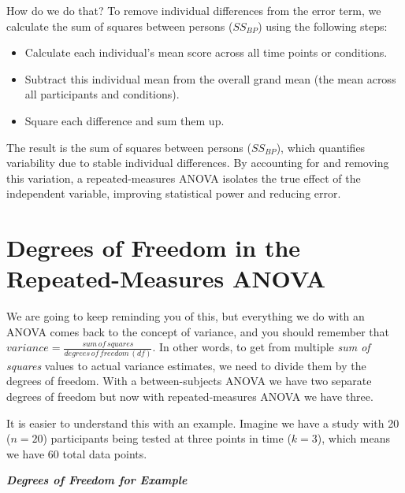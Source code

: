 \documentclass[
  letterpaper,
  DIV=11,
  numbers=noendperiod]{scrreprt}
\begin{document}
How do we do that? To remove individual differences from the error term,
we calculate the sum of squares between persons (\(SS_{BP}\)) using the
following steps:

\begin{itemize}
\item
  Calculate each individual's mean score across all time points or
  conditions.
\item
  Subtract this individual mean from the overall grand mean (the mean
  across all participants and conditions).
\item
  Square each difference and sum them up.
\end{itemize}

The result is the sum of squares between persons (\(SS_{BP}\)), which
quantifies variability due to stable individual differences. By
accounting for and removing this variation, a repeated-measures ANOVA
isolates the true effect of the independent variable, improving
statistical power and reducing error.

\section{Degrees of Freedom in the Repeated-Measures
ANOVA}\label{degrees-of-freedom-in-the-repeated-measures-anova}

We are going to keep reminding you of this, but everything we do with an
ANOVA comes back to the concept of variance, and you should remember
that \(variance = \frac{sum\,of\,squares}{degrees\,of\,freedom\,(df)}\).
In other words, to get from multiple \emph{sum of squares} values to
actual variance estimates, we need to divide them by the degrees of
freedom. With a between-subjects ANOVA we have two separate degrees of
freedom but now with repeated-measures ANOVA we have three.

It is easier to understand this with an example. Imagine we have a study
with 20 (\(n = 20\)) participants being tested at three points in time
(\(k = 3\)), which means we have 60 total data points.

\textbf{\emph{Degrees of Freedom for Example}}
\end{document}
